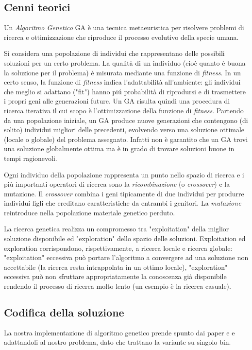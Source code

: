 \subsection{Cenni teorici}
Un \textit{Algoritmo Genetico} GA è una tecnica metaeuristica per risolvere problemi di ricerca e ottimizzazione che riproduce il processo evolutivo della specie umana.

Si considera una popolazione di individui che rappresentano delle possibili soluzioni per un certo problema. La qualità di un individuo (cioè quanto è buona la soluzione per il problema) è misurata mediante una funzione di \emph{fitness}. In un certo senso, la funzione di \emph{fitness} indica l’adattabilità all’ambiente: gli individui che meglio si adattano ("fit") hanno piú probabilità di riprodursi e di trasmettere i propri geni alle generazioni future. Un GA risulta quindi una procedura di ricerca iterativa il cui scopo è l’ottimizzazione della funzione di \emph{fitness}. Partendo da una popolazione iniziale, un GA produce nuove generazioni che contengono (di solito) individui migliori delle precedenti, evolvendo verso una soluzione ottimale (locale o globale) del problema assegnato. Infatti non è garantito che un GA trovi una soluzione globalmente ottima ma è in grado di trovare soluzioni buone in tempi ragionevoli.

Ogni individuo della popolazione rappresenta un punto nello spazio di ricerca e i più importanti operatori di ricerca sono la \emph{ricombinazione} (o \emph{crossover}) e la mutazione. Il \emph{crossover} combina i geni tipicamente di due individui per produrre individui figli che ereditano caratteristiche da entrambi i genitori. La \emph{mutazione} reintroduce nella popolazione materiale genetico perduto.

La ricerca genetica realizza un compromesso tra "exploitation" della miglior soluzione disponibile ed "exploration" dello spazio delle soluzioni. Exploitation ed exploration corrispondono, rispettivamente, a ricerca locale e ricerca globale: "exploitation" eccessiva può portare l’algoritmo a convergere ad una soluzione non accettabile (la ricerca resta intrappolata in un ottimo locale), "exploration" eccessiva può non sfruttare appropriatamente la conoscenza già disponibile rendendo il processo di ricerca molto lento (un esempio è la ricerca casuale).

\subsection{Codifica della soluzione}
La nostra implementazione di algoritmo genetico prende spunto dai paper \cite{Jakobs} e \cite{Hopper} e adattandoli al nostro problema, dato che trattano la variante su singolo bin.

